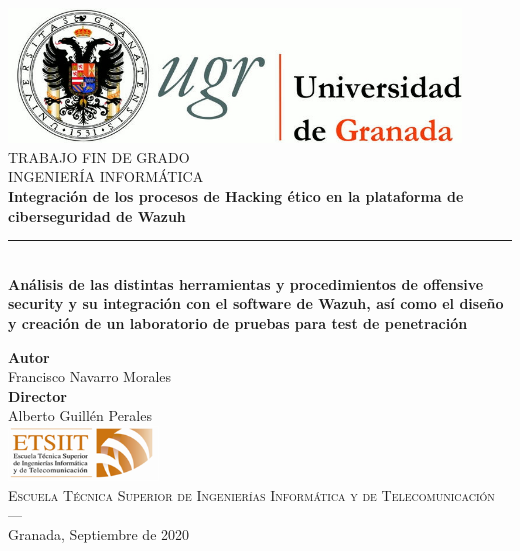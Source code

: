 \begin{titlepage}
 
 
\newlength{\centeroffset}
\setlength{\centeroffset}{-0.5\oddsidemargin}
\addtolength{\centeroffset}{0.5\evensidemargin}
\thispagestyle{empty}

\noindent\hspace*{\centeroffset}\begin{minipage}{\textwidth}

\centering
\includegraphics[width=0.9\textwidth]{imagenes/logo_ugr.jpg}\\[1.4cm]

\textsc{ \Large TRABAJO FIN DE GRADO\\[0.2cm]}
\textsc{ INGENIERÍA INFORMÁTICA}\\[1cm]
% 
{\Huge\bfseries Integración de los procesos de Hacking ético en la plataforma de ciberseguridad de Wazuh \\
}
\noindent\rule[-1ex]{\textwidth}{3pt}\\[3.5ex]
{\large\bfseries Análisis de las distintas herramientas y procedimientos de offensive security y su integración con el software de Wazuh, así como el diseño y creación de un laboratorio de pruebas para test de penetración}
\end{minipage}

\vspace{2.5cm}
\noindent\hspace*{\centeroffset}\begin{minipage}{\textwidth}
\centering

\textbf{Autor}\\ {Francisco Navarro Morales}\\[2.5ex]
\textbf{Director}\\
{Alberto Guillén Perales\\}
\includegraphics[width=0.3\textwidth]{imagenes/etsiit_logo.png}\\[0.1cm]
\textsc{Escuela Técnica Superior de Ingenierías Informática y de Telecomunicación}\\
\textsc{---}\\
Granada, Septiembre de 2020
\end{minipage}
\end{titlepage}


